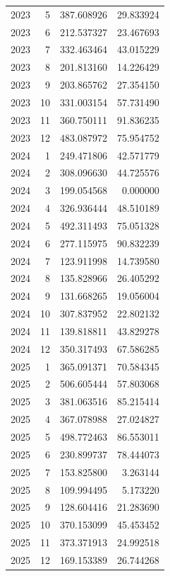 \begin{tabular}{rrrr}
2023 & 5 & 387.608926 & 29.833924 \\
2023 & 6 & 212.537327 & 23.467693 \\
2023 & 7 & 332.463464 & 43.015229 \\
2023 & 8 & 201.813160 & 14.226429 \\
2023 & 9 & 203.865762 & 27.354150 \\
2023 & 10 & 331.003154 & 57.731490 \\
2023 & 11 & 360.750111 & 91.836235 \\
2023 & 12 & 483.087972 & 75.954752 \\
2024 & 1 & 249.471806 & 42.571779 \\
2024 & 2 & 308.096630 & 44.725576 \\
2024 & 3 & 199.054568 & 0.000000 \\
2024 & 4 & 326.936444 & 48.510189 \\
2024 & 5 & 492.311493 & 75.051328 \\
2024 & 6 & 277.115975 & 90.832239 \\
2024 & 7 & 123.911998 & 14.739580 \\
2024 & 8 & 135.828966 & 26.405292 \\
2024 & 9 & 131.668265 & 19.056004 \\
2024 & 10 & 307.837952 & 22.802132 \\
2024 & 11 & 139.818811 & 43.829278 \\
2024 & 12 & 350.317493 & 67.586285 \\
2025 & 1 & 365.091371 & 70.584345 \\
2025 & 2 & 506.605444 & 57.803068 \\
2025 & 3 & 381.063516 & 85.215414 \\
2025 & 4 & 367.078988 & 27.024827 \\
2025 & 5 & 498.772463 & 86.553011 \\
2025 & 6 & 230.899737 & 78.444073 \\
2025 & 7 & 153.825800 & 3.263144 \\
2025 & 8 & 109.994495 & 5.173220 \\
2025 & 9 & 128.604416 & 21.283690 \\
2025 & 10 & 370.153099 & 45.453452 \\
2025 & 11 & 373.371913 & 24.992518 \\
2025 & 12 & 169.153389 & 26.744268 \\
\bottomrule
\end{tabular}
